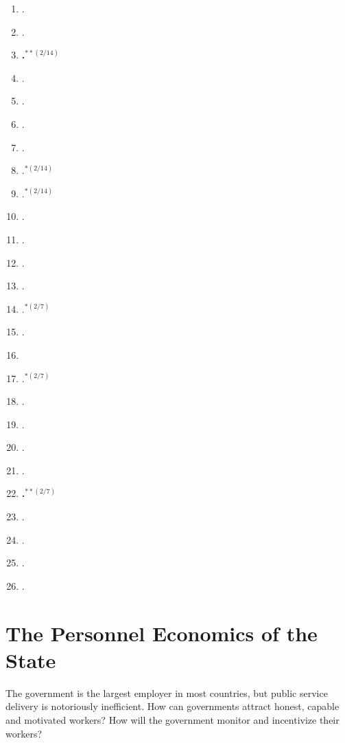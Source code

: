 \documentclass[11pt]{article}
\begin{document}
\begin{enumerate}
\item {}.
\item {}.
\item \textbf{.$^{**(2/14)}$}
\item {}.
\item {}.
\item {}.
\item {}.
\item {}.$^{*(2/14)}$
\item {}.$^{*(2/14)}$
\item {}.
\item {}.
\item {}.
\item {}.
\item {}.$^{*(2/7)}$
\item {}.
\item {}
\item {}.$^{*(2/7)}$
\item {}.
\item {}.
\item {}.
\item {}.
\item \textbf{.$^{**(2/7)}$}
\item {}.
\item {}.
\item {}.
\item {}.
\end{enumerate}

\section{The Personnel Economics of the State}
The government is the largest employer in most countries, but public service delivery is notoriously inefficient. How can governments attract honest, capable and motivated workers? How will the government monitor and incentivize their workers?
\end{document}
